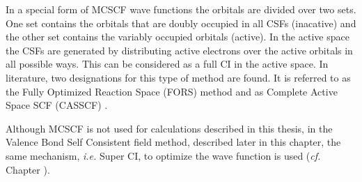 In a special form of MCSCF wave functions the orbitals are divided over two sets. One set contains the orbitals that are doubly occupied in all CSFs (inacative) and the other set contains the variably occupied orbitals (active). In the active space the CSFs are generated by distributing active electrons over the active orbitals in all possible ways. This can be considered as a full CI in the active space. In literature, two designations for this type of method are found. It is referred to as the Fully Optimized Reaction Space (FORS) method \cite{fors1,fors2,fors3} and as Complete Active Space SCF (CASSCF) \cite{roos1,roos2}.

Although MCSCF is not used for calculations described in this thesis, in the Valence Bond Self Consistent field method, described later in this chapter, the same mechanism, \textit{i.e.} Super CI, to optimize the wave function is used (\textit{cf.} Chapter \chorbopt).

